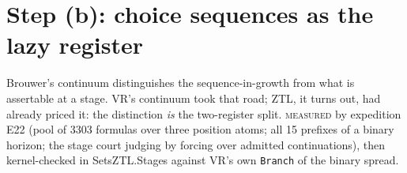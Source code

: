 \documentclass[11pt]{article}
\theoremstyle{remark}
\newcommand{\MEASURED}{\textsc{measured}}
\begin{document}
\section{Step (b): choice sequences as the lazy register}
\label{sec:stages}

Brouwer's continuum distinguishes the sequence-in-growth from what is
assertable at a stage. VR's continuum took that road; ZTL, it turns out,
had already priced it: the distinction \emph{is} the two-register split.
\MEASURED{} by expedition E22 (pool of 3303 formulas over three position
atoms; all 15 prefixes of a binary horizon; the stage court judging by
forcing over admitted continuations), then kernel-checked in
\textsf{SetsZTL.Stages} against VR's own \texttt{Branch} of the binary
spread.
\end{document}
